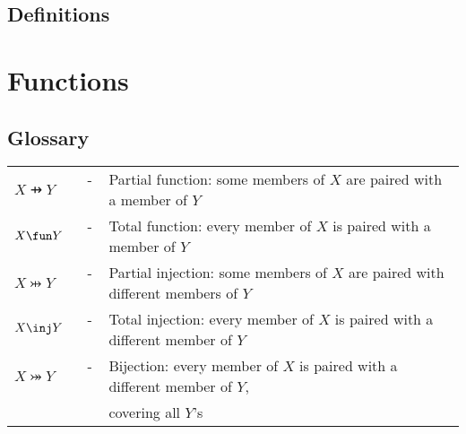 \subsection*{Definitions}



\newpage

\section*{Functions}

\subsection*{Glossary}

\begin{tabular}{l c l}
$X \pfun Y$ & ~-~ & Partial function: some members of $X$ are paired with a member of $Y$ \\
$X \fun Y$ & ~-~ & Total function: every member of $X$ is paired with a member of $Y$ \\
$X \pinj Y$ & ~-~ & Partial injection:  some members of $X$ are paired with different members of $Y$ \\
$X \inj Y$ & ~-~ & Total injection: every member of $X$ is paired with a different member of $Y$ \\
$X \bij Y$ & ~-~ & Bijection: every member of $X$ is paired with a different member of $Y$, \\
	& & covering all $Y$'s \\
\end{tabular}

